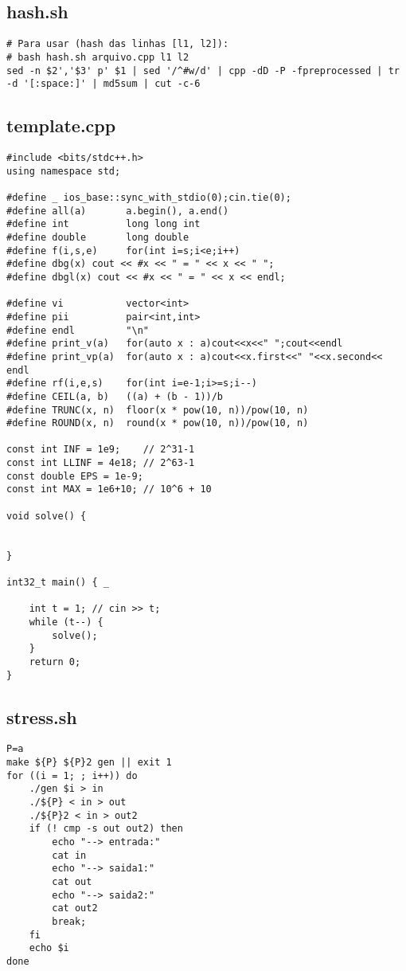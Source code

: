 \documentclass[11pt, a4paper, twoside]{article}
\begin{document}
\subsection{hash.sh}
\begin{lstlisting}
# Para usar (hash das linhas [l1, l2]):
# bash hash.sh arquivo.cpp l1 l2
sed -n $2','$3' p' $1 | sed '/^#w/d' | cpp -dD -P -fpreprocessed | tr -d '[:space:]' | md5sum | cut -c-6
\end{lstlisting}

\subsection{template.cpp}
\begin{lstlisting}
#include <bits/stdc++.h>
using namespace std;

#define _ ios_base::sync_with_stdio(0);cin.tie(0);
#define all(a)       a.begin(), a.end()
#define int          long long int
#define double       long double
#define f(i,s,e) 	 for(int i=s;i<e;i++)
#define dbg(x) cout << #x << " = " << x << " ";
#define dbgl(x) cout << #x << " = " << x << endl;

#define vi 			 vector<int>
#define pii	         pair<int,int>
#define endl         "\n"
#define print_v(a)   for(auto x : a)cout<<x<<" ";cout<<endl
#define print_vp(a)  for(auto x : a)cout<<x.first<<" "<<x.second<< endl
#define rf(i,e,s) 	 for(int i=e-1;i>=s;i--)
#define CEIL(a, b)   ((a) + (b - 1))/b
#define TRUNC(x, n)  floor(x * pow(10, n))/pow(10, n)
#define ROUND(x, n)  round(x * pow(10, n))/pow(10, n)

const int INF = 1e9;    // 2^31-1
const int LLINF = 4e18; // 2^63-1
const double EPS = 1e-9;
const int MAX = 1e6+10; // 10^6 + 10

void solve() {

	
}

int32_t main() { _
	
	int t = 1; // cin >> t;
	while (t--) {
		solve();
	}
	return 0;
}
\end{lstlisting}

\subsection{stress.sh}
\begin{lstlisting}
P=a
make ${P} ${P}2 gen || exit 1
for ((i = 1; ; i++)) do
	./gen $i > in
	./${P} < in > out
	./${P}2 < in > out2
	if (! cmp -s out out2) then
		echo "--> entrada:"
		cat in
		echo "--> saida1:"
		cat out
		echo "--> saida2:"
		cat out2
		break;
	fi
	echo $i
done
\end{lstlisting}
\end{document}

